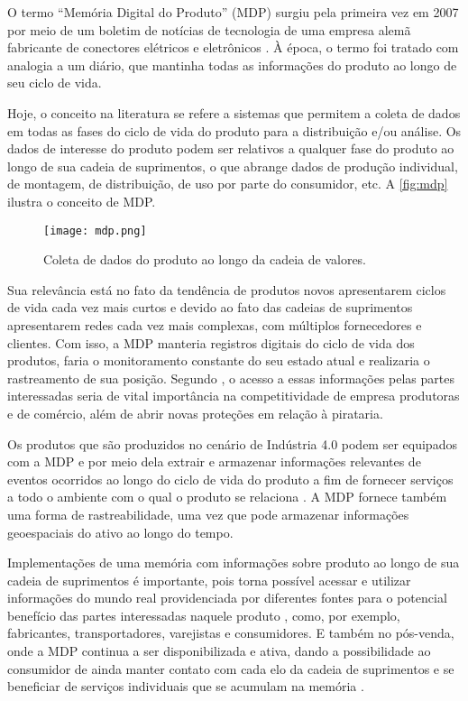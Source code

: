 	O termo ``Memória Digital do Produto'' (MDP) surgiu pela primeira vez em 2007 por meio de um boletim de notícias de tecnologia de uma empresa alemã fabricante de conectores elétricos e eletrônicos \cite{wahlster2007digitalmemory}. À época, o termo foi tratado com analogia a um diário, que mantinha todas as informações do produto ao longo de seu ciclo de vida.
	
	Hoje, o conceito na literatura se refere a sistemas que permitem a coleta de dados em todas as fases do ciclo de vida do produto para a distribuição e/ou análise. Os dados de interesse do produto podem ser relativos a qualquer fase do produto ao longo de sua cadeia de suprimentos, o que abrange dados de produção individual, de montagem, de distribuição, de uso por parte do consumidor, etc. A \autoref{fig:mdp} ilustra o conceito de MDP.
	
	\begin{figure}[htb]
		\centering
		\caption{Coleta de dados do produto ao longo da cadeia de valores.}
		\label{fig:mdp}
		\texttt{[image: mdp.png]}
	\end{figure}
	
	Sua relevância está no fato da tendência de produtos novos apresentarem ciclos de vida cada vez mais curtos e devido ao fato das cadeias de suprimentos apresentarem redes cada vez mais complexas, com múltiplos fornecedores e clientes. Com isso, a MDP manteria registros digitais do ciclo de vida dos produtos, faria o monitoramento constante do seu estado atual e realizaria o rastreamento de sua posição. Segundo , o acesso a essas informações pelas partes interessadas seria de vital importância na competitividade de empresa produtoras e de comércio, além de abrir novas proteções em relação à pirataria.
	
	Os produtos que são produzidos no cenário de Indústria 4.0 podem ser equipados com a MDP e por meio dela extrair e armazenar informações relevantes de eventos ocorridos ao longo do ciclo de vida do produto a fim de fornecer serviços a todo o ambiente com o qual o produto se relaciona \cite{brandherm2011productmemory}. A MDP fornece também uma forma de rastreabilidade, uma vez que pode armazenar informações geoespaciais do ativo ao longo do tempo.
	
	Implementações de uma memória com informações sobre produto ao longo de sua cadeia de suprimentos é importante, pois torna possível acessar e utilizar informações do mundo real providenciada por diferentes fontes para o potencial benefício das partes interessadas naquele produto \cite{brandherm2011productmemory}, como, por exemplo, fabricantes, transportadores, varejistas e consumidores. E também no pós-venda, onde a MDP continua a ser disponibilizada e ativa, dando a possibilidade ao consumidor de ainda manter contato com cada elo da cadeia de suprimentos e se beneficiar de serviços individuais que se acumulam na memória \cite{brandherm2011productmemory}.
	
